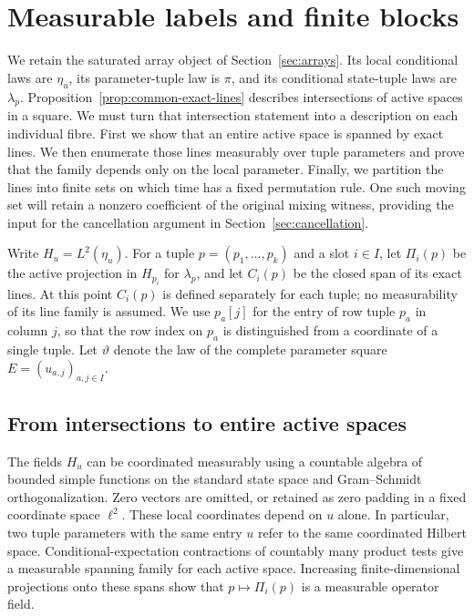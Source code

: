\section{Measurable labels and finite blocks}\label{sec:labels}

We retain the saturated array object of Section~\ref{sec:arrays}.
Its local conditional laws are $\eta_u$, its parameter-tuple law is $\pi$,
and its conditional state-tuple laws are $\lambda_p$.
Proposition~\ref{prop:common-exact-lines} describes intersections of active
spaces in a square. We must turn that intersection statement into a
description on each individual fibre. First we show that an entire
active space is spanned by exact lines. We then enumerate those lines
measurably over tuple parameters and prove that the family depends only
on the local parameter. Finally, we partition the lines into finite
sets on which time has a fixed permutation rule. One such moving set
will retain a nonzero coefficient of the original mixing witness,
providing the input for the cancellation argument in
Section~\ref{sec:cancellation}.

Write $H_u=L^2(\eta_u)$. For a tuple $p=(p_1,\ldots,p_k)$ and a slot
$i\in I$, let $\Pi_i(p)$ be the active projection in $H_{p_i}$ for
$\lambda_p$, and let $C_i(p)$ be the closed span of its exact lines.
At this point $C_i(p)$ is defined separately for each tuple; no
measurability of its line family is assumed.
We use $p_a[j]$ for the entry of row tuple $p_a$ in column $j$, so that
the row index on $p_a$ is distinguished from a coordinate of a single
tuple. Let $\vartheta$ denote the law of the complete parameter square
$E=(u_{a,j})_{a,j\in I}$.

\subsection{From intersections to entire active spaces}

The fields $H_u$ can be coordinated measurably using a countable algebra
of bounded simple functions on the standard state space and
Gram--Schmidt orthogonalization. Zero vectors are omitted, or retained
as zero padding in a fixed coordinate space $\ell^2$. These local
coordinates depend on $u$ alone. In particular, two tuple parameters
with the same entry $u$ refer to the same coordinated Hilbert space.
Conditional-expectation contractions of countably many product tests
give a measurable spanning family for each active space. Increasing
finite-dimensional projections onto these spans show that
$p\mapsto\Pi_i(p)$ is a measurable operator field.

